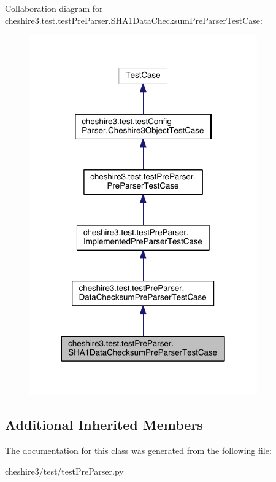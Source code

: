 Collaboration diagram for cheshire3.\-test.\-test\-Pre\-Parser.\-S\-H\-A1\-Data\-Checksum\-Pre\-Parser\-Test\-Case\-:
\nopagebreak
\begin{figure}[H]
\begin{center}
\leavevmode
\includegraphics[width=278pt]{classcheshire3_1_1test_1_1test_pre_parser_1_1_s_h_a1_data_checksum_pre_parser_test_case__coll__graph}
\end{center}
\end{figure}
\subsection*{Additional Inherited Members}


The documentation for this class was generated from the following file\-:\begin{DoxyCompactItemize}
\item 
cheshire3/test/test\-Pre\-Parser.\-py\end{DoxyCompactItemize}

